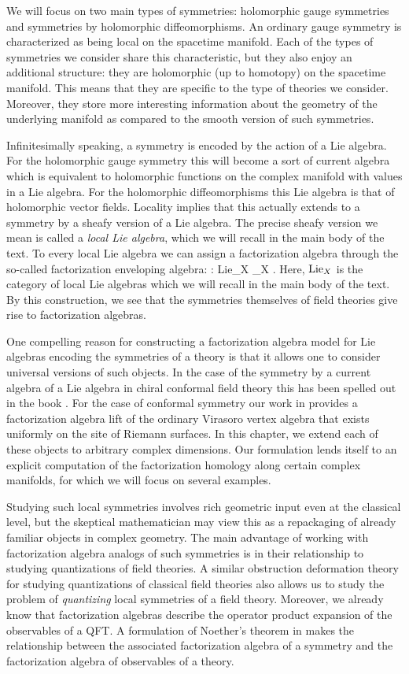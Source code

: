 \documentclass[10pt]{amsart}
\begin{document}
We will focus on two main types of symmetries: holomorphic gauge symmetries and symmetries by holomorphic diffeomorphisms. 
An ordinary gauge symmetry is characterized as being local on the spacetime manifold. 
Each of the types of symmetries we consider share this characteristic, but they also enjoy an additional structure: they are holomorphic (up to homotopy) on the spacetime manifold. 
This means that they are specific to the type of theories we consider.
Moreover, they store more interesting information about the geometry of the underlying manifold as compared to the smooth version of such symmetries.

Infinitesimally speaking, a symmetry is encoded by the action of a Lie algebra.
For the holomorphic gauge symmetry this will become a sort of current algebra which is equivalent to holomorphic functions on the complex manifold with values in a Lie algebra.
For the holomorphic diffeomorphisms this Lie algebra is that of holomorphic vector fields.
Locality implies that this actually extends to a symmetry by a sheafy version of a Lie algebra. 
The precise sheafy version we mean is called a {\em local Lie algebra}, which we will recall in the main body of the text. 
To every local Lie algebra we can assign a factorization algebra through the so-called factorization enveloping algebra:
\ben
{} : {\rm Lie}_X _X .
\een
Here, ${\rm Lie}_X$ is the category of local Lie algebras which we will recall in the main body of the text.
By this construction, we see that the symmetries themselves of field theories give rise to factorization algebras. 

One compelling reason for constructing a factorization algebra model for Lie algebras encoding the symmetries of a theory is that it allows one to consider universal versions of such objects.
In the case of the symmetry by a current algebra of a Lie algebra in chiral conformal field theory this has been spelled out in the book \cite{CG}. 
For the case of conformal symmetry our work in \cite{BWVir} provides a factorization algebra lift of the ordinary Virasoro vertex algebra that exists uniformly on the site of Riemann surfaces. 
In this chapter, we extend each of these objects to arbitrary complex dimensions.
Our formulation lends itself to an explicit computation of the factorization homology along certain complex manifolds, for which we will focus on several examples.

Studying such local symmetries involves rich geometric input even at the classical level, but the skeptical mathematician may view this as a repackaging of already familiar objects in complex geometry.
The main advantage of working with factorization algebra analogs of such symmetries is in their relationship to studying quantizations of field theories.
A similar obstruction deformation theory for studying quantizations of classical field theories also allows us to study the problem of {\em quantizing} local symmetries of a field theory.
Moreover, we already know that factorization algebras describe the operator product expansion of the observables of a QFT.
A formulation of Noether's theorem in \cite{CG} makes the relationship between the associated factorization algebra of a symmetry and the factorization algebra of observables of a theory.
\end{document}
